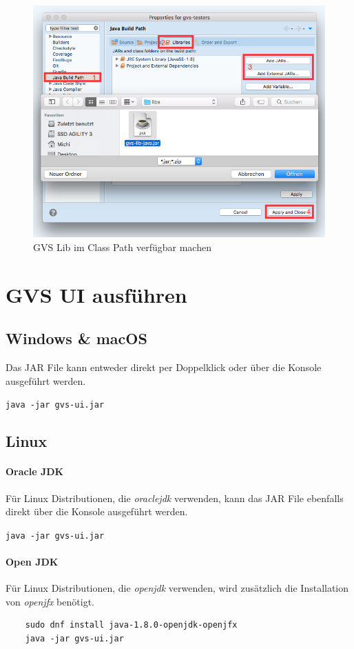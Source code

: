 \documentclass[11pt,a4paper,english,oneside]{book}
\numberwithin{equation}{chapter}
\begin{document}
	\begin{figure}[h!]
		\centering
		\includegraphics[width=0.5\linewidth]{assets/images/lib-integration}
		\caption{GVS Lib im Class Path verfügbar machen}
		\label{fig:lib-integration}
	\end{figure}
	
	\section{GVS UI ausführen}
	\subsection{Windows \& macOS}
	Das JAR File kann entweder direkt per Doppelklick oder über die Konsole ausgeführt werden.
	
	\lstinline{java -jar gvs-ui.jar}
	
	\subsection{Linux}
	\paragraph{Oracle JDK}
	Für Linux Distributionen, die \textit{oraclejdk} verwenden, kann das JAR File ebenfalls direkt über die Konsole ausgeführt werden.
	
	\lstinline{java -jar gvs-ui.jar}
	
	\paragraph{Open JDK}
	Für Linux Distributionen, die \textit{openjdk} verwenden, wird zusätzlich die Installation von \textit{openjfx} benötigt.
	
	\begin{lstlisting}
	sudo dnf install java-1.8.0-openjdk-openjfx
	java -jar gvs-ui.jar
	\end{lstlisting}
	
\end{document}
